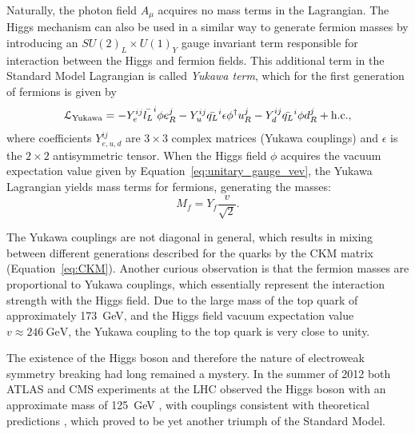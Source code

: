 Naturally, the photon field $A_\mu$ acquires no mass terms in the Lagrangian. The Higgs mechanism can also be used in a
similar way to generate fermion masses by introducing an $SU(2)_L \times U(1)_Y$ gauge invariant term responsible for
interaction between the Higgs and fermion fields. This additional term in the Standard Model Lagrangian is called
\textit{Yukawa term}, which for the first generation of fermions is given by
\begin{equation}
\mathcal{L}_\textrm{Yukawa} = -Y_e^{ij} \bar{l_L}^i \phi e_R^j - Y_u^{ij} \bar{q_L}^i \epsilon \phi^\dag u_R^j - Y_d^{ij}
\bar{q_L}^i \phi d_R^j + \textrm{h.c.},
\end{equation}
where coefficients $Y_{e,u,d}^{ij}$ are $3\times3$ complex matrices (Yukawa couplings) and $\epsilon$ is the $2\times2$
antisymmetric tensor. When the Higgs field $\phi$ acquires the vacuum expectation value given by
Equation~\ref{eq:unitary_gauge_vev}, the Yukawa Lagrangian yields mass terms for fermions, generating the masses:
\begin{equation}
M_f = Y_f \frac{v}{\sqrt{2}}.
\end{equation}

The Yukawa couplings are not diagonal in general, which results in mixing between different generations described for
the quarks by the CKM matrix (Equation~\ref{eq:CKM}). Another curious observation is that the fermion masses are
proportional to Yukawa couplings, which essentially represent the interaction strength with the Higgs field. Due to the
large mass of the top quark of approximately \SI{173}{\GeV}, and the Higgs field vacuum expectation value
$v\approx\SI{246}{\GeV}$, the Yukawa coupling to the top quark is very close to unity.

The existence of the Higgs boson and therefore the nature of electroweak symmetry breaking had long remained a mystery.
In the summer of 2012 both ATLAS and CMS experiments at the LHC observed the Higgs boson with an approximate mass of
\SI{125}{\GeV} \autocite{ATLAS_higgs_observation, CMS_higgs_observation}, with couplings consistent with theoretical
predictions \autocite{CMS_Higgs_long_paper, ATLAS_Higgs_couplings}, which proved to be yet another triumph of the
Standard Model.

\newpage
